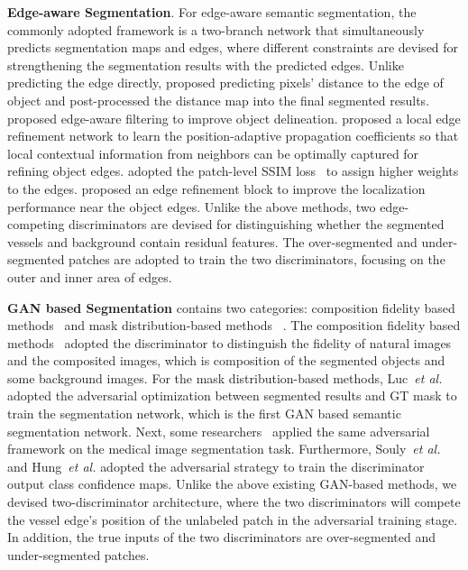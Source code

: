 \documentclass[letterpaper]{article} %
\begin{document}
\textbf{Edge-aware Segmentation}.
For edge-aware semantic segmentation, the commonly adopted framework is a two-branch network that simultaneously predicts segmentation maps and edges, where different constraints \citep{bertasius2016semantic,chen2016semantic,heng2017fusionNet:,yu2018learning,Yin_2018_ECCV,Ye_2019_CVPR,takikawa2019gated-scnn:} are devised for strengthening the segmentation results with the predicted edges. Unlike predicting the edge directly,
\citet{hayder2017boundary-aware} proposed predicting pixels' distance to the edge of object and post-processed the distance map into the final segmented results.
 ~\citet{khoreva2017simple} proposed edge-aware filtering to improve object delineation.
\citet{zhang2017global-residual} proposed a local edge refinement network to learn the position-adaptive propagation coefficients so that local contextual information from neighbors can be optimally captured for refining object edges.
\citet{qin2019basnet:} adopted the patch-level SSIM loss~\citep{wang2003multiscale} to assign higher weights to the edges.
\citet{peng2017large} proposed an edge refinement block to improve the localization performance near the object edges.
Unlike the above methods,
two edge-competing discriminators are devised for distinguishing whether the segmented vessels and background contain residual features.
The over-segmented and under-segmented patches are adopted to train the two discriminators, focusing on the outer and inner area
of edges.

\textbf{GAN based Segmentation} contains two categories: composition fidelity based methods~\cite{ostyakov2018seigan:,remez2018learning,chen2019unsupervised,QiuECCV_2020} and mask distribution-based methods ~\cite{luc2016semantic,han2017transferring,arbelle2018microscopy,hung2018adversarial,Ye_2020_CVPR}.
The composition fidelity based methods~\cite{ostyakov2018seigan:,remez2018learning,chen2019unsupervised} adopted the discriminator to distinguish the fidelity of natural images and the composited images, which is composition of the segmented objects and some background images.
For the mask distribution-based methods, Luc~\emph{et al.}~\cite{luc2016semantic} adopted the adversarial optimization between segmented results and GT mask to train the segmentation network, which is the first GAN based semantic segmentation network. Next, some researchers~\cite{han2017transferring,arbelle2018microscopy,xue2018segan:} applied the same adversarial framework on the medical image segmentation task. Furthermore, Souly~\emph{et al.} \cite{souly2017semi} and Hung~\emph{et al.} \cite{hung2018adversarial} adopted the adversarial strategy to train the discriminator output class confidence maps.
Unlike the above existing GAN-based methods, we devised two-discriminator architecture,
where the two discriminators will compete the vessel edge's position of the unlabeled patch in the adversarial training stage.
In addition, the true inputs of the two discriminators are over-segmented and under-segmented patches.
\end{document}
